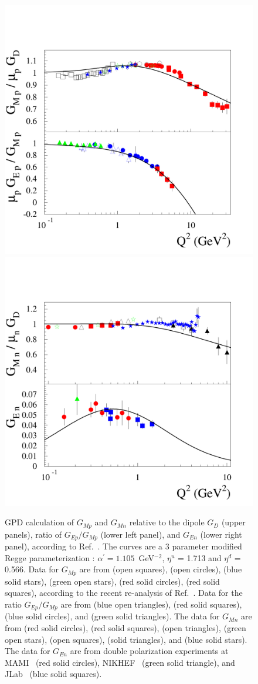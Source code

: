 \begin{figure}[t]
\begin{center}
  \includegraphics[width = 6.5 cm]{gegmproton_col.pdf}
  \includegraphics[width = 6.5 cm]{gegmneutron_col.pdf}
\caption{\small GPD calculation of 
$G_{Mp}$ and $G_{Mn}$ relative to the dipole $G_D$ (upper panels), 
ratio of $G_{Ep}/G_{Mp}$ (lower left panel), 
and $G_{En}$ (lower right panel), according to Ref.~\cite{guidal}. 
The curves are a 3 parameter modified Regge parameterization : 
$\alpha^\prime = 1.105$\, GeV$^{-2}$, $\eta^u$ = 1.713 and $\eta^d$ = 0.566. 
Data for $G_{M p}$ are from   
\cite{janssens} (open squares), \cite{litt} (open circles),
\cite{berger} (blue solid stars), \cite{bartel} (green open stars), 
\cite{andivahis} (red solid circles), \cite{sill} 
(red solid squares), 
according to the recent re-analysis of Ref.~\cite{brash}. 
Data for the ratio $G_{E p} / G_{M p}$ are from 
\cite{gayou1} (blue open triangles), 
\cite{gayou2} (red solid squares),
\cite{punjabi05} (blue solid circles), 
and \cite{crawford} (green solid triangles). 
The data for $G_{M n}$ are from 
\cite{xu00} (red solid circles), 
\cite{xu02} (red solid squares),    
\cite{anklin2} (open triangles), \cite{kubon} (green open stars), 
\cite{lung} (open squares), \cite{rock} (solid triangles), 
and \cite{brooks} (blue solid stars).
The data for $G_{E n}$ are from 
double polarization experiments at 
MAMI~\cite{herberg,ostrick,becker,rohe,glazier} (red solid circles), 
NIKHEF~\cite{passchier} (green solid triangle),  
and JLab~\cite{zhu,madey,warren} (blue solid squares). 
}
\label{fig:gegmpn}
\end{center}
\end{figure}

